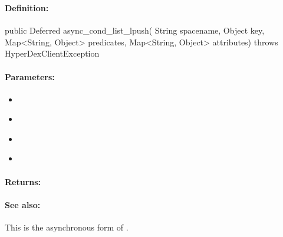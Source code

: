 \pagebreak
\subsubsection{}
\label{api:java:async_cond_list_lpush}


\paragraph{Definition:}
\begin{javacode}
public Deferred async_cond_list_lpush(
        String spacename,
        Object key,
        Map<String, Object> predicates,
        Map<String, Object> attributes) throws HyperDexClientException
\end{javacode}

\paragraph{Parameters:}
\begin{itemize}[noitemsep]
\item {}\\

\item {}\\

\item {}\\

\item {}\\

\end{itemize}

\paragraph{Returns:}


\paragraph{See also:}  This is the asynchronous form of .

\pagebreak
